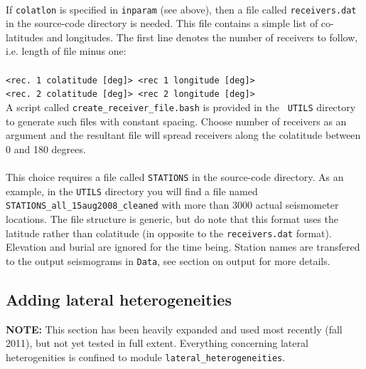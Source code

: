 \documentclass[11pt,letter,fleqn,english,notitlepage]{article}
\begin{document}
\\
If {\tt colatlon} is specified in {\tt inparam} (see above), then a file called
{\tt receivers.dat} in the source-code directory is needed. This file contains
a simple list of co-latitudes and longitudes.  The first line denotes the
number of receivers to follow, i.e. length of file minus one:\\ 
{\tt <number of receivers>\\
<rec. 1 colatitude [deg]> <rec 1 longitude [deg]>\\
<rec. 2 colatitude [deg]> <rec 2 longitude [deg]>}\\

\noindent 
A script called {\tt create\_receiver\_file.bash} is provided in the {\tt
UTILS} directory to generate such files with constant spacing. Choose number of
receivers as an argument and the resultant file will spread receivers along the
colatitude between 0 and 180 degrees.\\

\\
This choice requires a file called {\tt STATIONS} in the source-code directory.
As an example, in the {\tt UTILS} directory you will find a file named {\tt
STATIONS\_all\_15aug2008\_cleaned} with more than 3000 actual seismometer
locations.  The file structure is generic, but do note that this format uses
the latitude rather than colatitude (in opposite to the {\tt receivers.dat}
format).  Elevation and burial are ignored for the time being. Station names
are transfered to the output seismograms in {\tt Data}, see section on output
for more details.

\subsection{Adding lateral heterogeneities}
\lstset{frame=single,basicstyle=\footnotesize, breaklines=true }


\textbf{NOTE:} This section has been heavily expanded and used most recently
(fall 2011), but not yet tested in full extent. Everything concerning lateral
heterogenities is confined to module {\tt lateral\_heterogeneities}.\\
\end{document}
